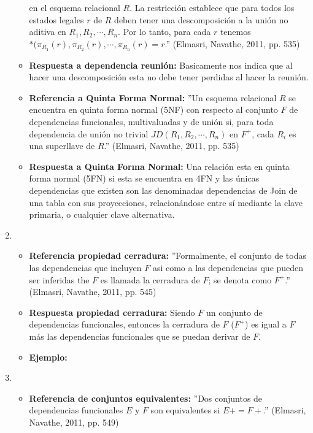 \documentclass[twoside]{article}
\begin{document}
\begin{enumerate}
\begin{itemize}
                        en el esquema relacional $R$. La restricci\'on establece que para todos los estados legales $r$ de $R$ deben tener una descomposici\'on a la uni\'on no aditiva en
                        $R_1, R_2, \cdots, R_n$. Por lo tanto, para cada $r$ tenemos $*(\pi_{R_1}(r), \pi_{R_2}(r), \cdots , \pi_{R_n}(r) = r$.'' (Elmasri, Navathe, 2011, pp. 535)
                  \item \textbf{Respuesta a dependencia reuni\'on:} Basicamente nos indica que al hacer una descomposici\'on esta no debe tener perdidas al hacer la reuni\'on.
                  \item \textbf{Referencia a Quinta Forma Normal:} ''Un esquema relacional $R$ se encuentra en quinta forma normal (5NF) con respecto al conjunto $F$ de dependencias
                        funcionales, multivaluadas y de uni\'on si, para toda dependencia de uni\'on no trivial $JD(R_1, R_2, \cdots , R_n)$ en $F^+$, cada $R_i$ es una superllave de $R$.''
                        (Elmasri, Navathe, 2011, pp. 535)
                  \item \textbf{Respuesta a Quinta Forma Normal:} Una relación esta en quinta forma normal (5FN) si esta se encuentra en 4FN y las únicas dependencias que existen
                        son las denominadas dependencias de Join de una tabla con sus proyecciones, relacionándose entre sí mediante la clave primaria, o cualquier clave alternativa.
            \end{itemize}
      \item
            \begin{itemize}
                  \item \textbf{Referencia propiedad cerradura:} ''Formalmente, el conjunto de todas las dependencias que incluyen $F$ asi como a las dependencias que pueden ser inferidas
                        the $F$ es llamada la cerradura de $F$; se denota como $F^+$.'' (Elmasri, Navathe, 2011, pp. 545)
                  \item \textbf{Respuesta propiedad cerradura:} Siendo $F$ un conjunto de dependencias funcionales, entonces la cerradura de $F$ ($F^+$) es igual a $F$ m\'as las dependencias
                        funcionales que se puedan derivar de $F$.
                  \item \textbf{Ejemplo:} 
            \end{itemize}
      \item
            \begin{itemize}
                  \item \textbf{Referencia de conjuntos equivalentes:} ''Dos conjuntos de dependencias funcionales $E$ y $F$ son equivalentes si $E+ = F+$.'' (Elmasri, Navathe, 2011, pp. 549)

\end{itemize}
\end{enumerate}
\end{document}
